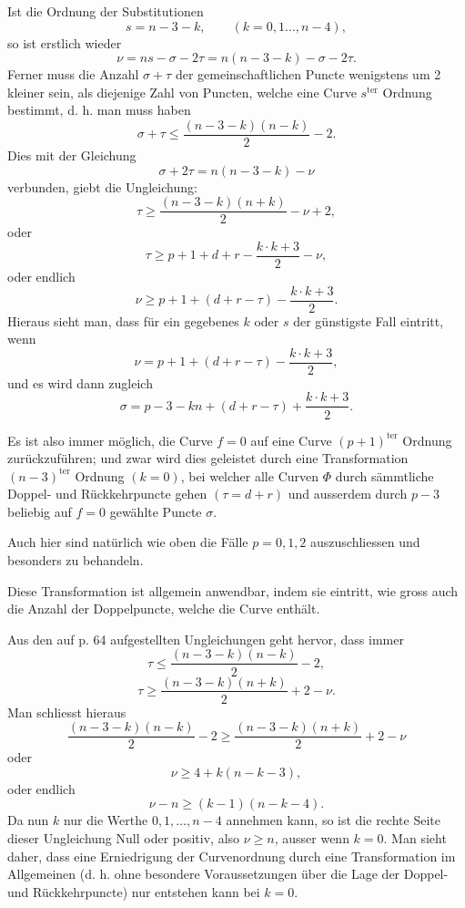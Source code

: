 \documentclass[10pt]{article}
\begin{document}
Ist die Ordnung der Substitutionen
\[
s=n-3-k,\qquad (k=0,1\ldots,n-4),
\]
so ist erstlich wieder
\[
\nu=ns-\sigma-2\tau=n(n-3-k)-\sigma-2\tau.
\]
Ferner muss die Anzahl \(\sigma+\tau\) der gemeinschaftlichen Puncte wenigstens um 2 kleiner sein, als diejenige Zahl von Puncten, welche eine Curve \(s^{\text{ter}}\) Ordnung bestimmt, d. h. man muss haben
\[
\sigma+\tau\le \frac{(n-3-k)(n-k)}{2}-2.
\]
Dies mit der Gleichung
\[
\sigma+2\tau=n(n-3-k)-\nu
\]
verbunden, giebt die Ungleichung:
\[
\tau\ge \frac{(n-3-k)(n+k)}{2}-\nu+2,
\]
oder
\[
\tau\ge p+1+d+r-\frac{k\cdot k+3}{2}-\nu,
\]
oder endlich
\[
\nu\ge p+1+(d+r-\tau)-\frac{k\cdot k+3}{2}.
\]
Hieraus sieht man, dass für ein gegebenes \(k\) oder \(s\) der günstigste Fall eintritt, wenn
\[
\nu=p+1+(d+r-\tau)-\frac{k\cdot k+3}{2},
\]
und es wird dann zugleich
\[
\sigma=p-3-kn+(d+r-\tau)+\frac{k\cdot k+3}{2}.
\]

Es ist also immer möglich, die Curve \(f=0\) auf eine Curve \((p+1)^{\text{ter}}\) Ordnung zurückzuführen; und zwar wird dies geleistet durch eine Transformation \((n-3)^{\text{ter}}\) Ordnung \((k=0)\), bei welcher alle Curven \(\Phi\) durch sämmtliche Doppel- und Rückkehrpuncte gehen \((\tau=d+r)\) und ausserdem durch \(p-3\) beliebig auf \(f=0\) gewählte Puncte \(\sigma\).

Auch hier sind natürlich wie oben die Fälle \(p=0,1,2\) auszuschliessen und besonders zu behandeln.

Diese Transformation ist allgemein anwendbar, indem sie eintritt, wie gross auch die Anzahl der Doppelpuncte, welche die Curve enthält.

Aus den auf p. 64 aufgestellten Ungleichungen geht hervor, dass immer
\[
\tau\le \frac{(n-3-k)(n-k)}{2}-2,
\]
\[
\tau\ge \frac{(n-3-k)(n+k)}{2}+2-\nu.
\]
Man schliesst hieraus
\[
\frac{(n-3-k)(n-k)}{2}-2
\ge
\frac{(n-3-k)(n+k)}{2}+2-\nu
\]
oder
\[
\nu\ge 4+k(n-k-3),
\]
oder endlich
\[
\nu-n\ge (k-1)(n-k-4).
\]
Da nun \(k\) nur die Werthe \(0,1,\ldots,n-4\) annehmen kann, so ist die rechte Seite dieser Ungleichung Null oder positiv, also \(\nu\ge n\), ausser wenn \(k=0\). Man sieht daher, dass eine Erniedrigung der Curvenordnung durch eine Transformation im Allgemeinen (d. h. ohne besondere Voraussetzungen über die Lage der Doppel- und Rückkehrpuncte) nur entstehen kann bei \(k=0\).
\end{document}
